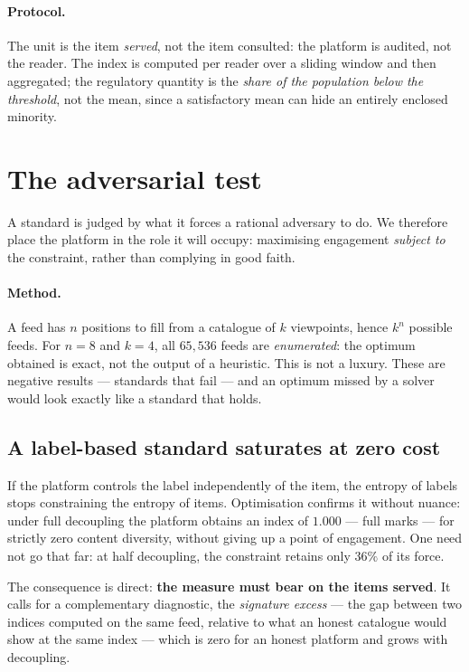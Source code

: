 \documentclass[11pt,a4paper]{article}
\begin{document}
\paragraph{Protocol.} The unit is the item \emph{served}, not the item consulted: the platform
is audited, not the reader. The index is computed per reader over a sliding window and then
aggregated; the regulatory quantity is the \emph{share of the population below the threshold},
not the mean, since a satisfactory mean can hide an entirely enclosed minority.

\section{The adversarial test}
\label{sec:adversarial}

A standard is judged by what it forces a rational adversary to do. We therefore place the
platform in the role it will occupy: maximising engagement \emph{subject to} the constraint,
rather than complying in good faith.

\paragraph{Method.} A feed has $n$ positions to fill from a catalogue of $k$ viewpoints, hence
$k^n$ possible feeds. For $n = 8$ and $k = 4$, all $65{,}536$ feeds are \emph{enumerated}: the
optimum obtained is exact, not the output of a heuristic. This is not a luxury. These are
negative results --- standards that fail --- and an optimum missed by a solver would look
exactly like a standard that holds.

\subsection{A label-based standard saturates at zero cost}

If the platform controls the label independently of the item, the entropy of labels stops
constraining the entropy of items. Optimisation confirms it without nuance: under full
decoupling the platform obtains an index of $1.000$ --- full marks --- for strictly zero content
diversity, without giving up a point of engagement. One need not go that far: at half
decoupling, the constraint retains only $36\%$ of its force.

The consequence is direct: \textbf{the measure must bear on the items served}. It calls for a
complementary diagnostic, the \emph{signature excess} --- the gap between two indices computed
on the same feed, relative to what an honest catalogue would show at the same index --- which is
zero for an honest platform and grows with decoupling.
\end{document}
